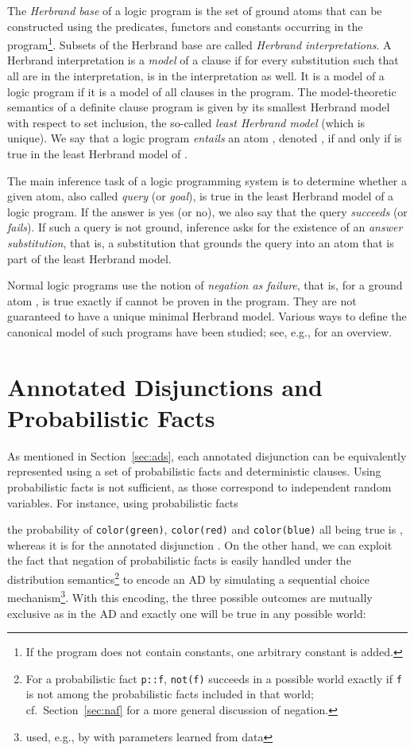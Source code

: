\documentclass[a4paper]{article}
\begin{document}
The \emph{Herbrand base} of a logic program is the set of ground atoms that can be constructed using the predicates, functors and constants occurring in the program\footnote{If the program does not contain constants, one arbitrary constant is added.}. Subsets of the Herbrand base are called \emph{Herbrand interpretations}. A Herbrand interpretation is a \emph{model} of a clause  if for every substitution  such that all  are in the interpretation,  is in the interpretation as well. It is a model of a logic program if it is a model of all clauses in the program. The model-theoretic semantics of a definite clause program is given by its smallest Herbrand model with respect to set inclusion, the so-called \emph{least Herbrand model} (which is unique). We say that a logic program  \emph{entails} an atom , denoted , if and only if  is true in the least Herbrand model of .   

The main inference task of a logic programming system is to determine
whether a given atom, also called \emph{query} (or \emph{goal}), is true in the least
Herbrand model of a logic program. If the answer is yes (or no), we also say that the query \emph{succeeds} (or \emph{fails}). If such a query is not ground, inference asks for the existence of an \emph{answer substitution}, that is, a substitution that grounds the query into an atom that is part of the least Herbrand model. 



Normal logic programs use the notion of \emph{negation as failure}, that is, for a ground atom ,  is true exactly if  cannot be proven in the program. They are not guaranteed to have a unique minimal Herbrand model. Various ways to define the canonical model of such programs have been studied; see, e.g., \cite[Chapter 3]{lloyd:book89} for an overview. 




\section{Annotated Disjunctions and Probabilistic Facts}
\label{app:adpf} 
As mentioned in Section~\ref{sec:ads}, each annotated disjunction can be equivalently
represented using a set of probabilistic facts and deterministic
clauses.  Using probabilistic facts is not sufficient, as those
correspond to independent random variables. For instance, using
probabilistic facts 

the probability of \verb|color(green)|, \verb|color(red)| and
\verb|color(blue)| all being true is , whereas it is  for the
annotated disjunction . 
On the other hand, we can exploit the fact that negation of
probabilistic facts is easily handled under the distribution
semantics\footnote{For a probabilistic fact \texttt{p::f}, \texttt{not(f)}
  succeeds in a possible world exactly if \texttt{f} is not among the
  probabilistic facts included in that world;
  cf.~Section~\ref{sec:naf} for a more general discussion of negation.}
to encode an AD by simulating a
sequential choice mechanism\footnote{used, e.g., by
  \cite{sato:ijcai97} with parameters learned from data}. With this encoding, the three possible outcomes are mutually
exclusive as in the AD and exactly one will be true in any possible
world: 
\end{document}
